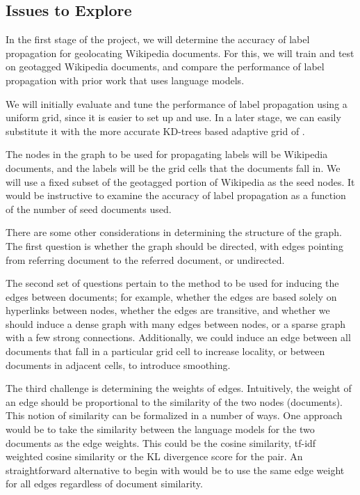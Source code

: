 \documentclass[11pt]{article}
\begin{document}
\subsection{Issues to Explore}
In the first stage of the project, we will determine the accuracy of label propagation for geolocating Wikipedia documents. For this, we will train and test on geotagged Wikipedia documents, and compare the performance of label propagation with prior work that uses language models.

We will initially evaluate and tune the performance of label propagation using a uniform grid, since it is easier to set up and use. In a later stage, we can easily substitute it with the more accurate KD-trees based adaptive grid of \cite{rolleretal:12}.

The nodes in the graph to be used for propagating labels will be Wikipedia documents, and the labels will be the grid cells that the documents fall in. We will use a fixed subset of the geotagged portion of Wikipedia as the seed nodes. It would be instructive to examine the accuracy of label propagation as a function of the number of seed documents used. 

There are some other considerations in determining the structure of the graph. The first question is whether the graph should be directed, with edges pointing from referring document to the referred document, or undirected. 

The second set of questions pertain to the method to be used for inducing the edges between documents; for example, whether the edges are based solely on hyperlinks between nodes, whether the edges are transitive, and whether we should induce a dense graph with many edges between nodes, or a sparse graph with a few strong connections. Additionally, we could induce an edge between all documents that fall in a particular grid cell to increase locality, or between documents in adjacent cells, to introduce smoothing.

The third challenge is determining the weights of edges. Intuitively, the weight of an edge should be proportional to the similarity of the two nodes (documents). This notion of similarity can be formalized in a number of ways. One approach would be to take the similarity between the language models for the two documents as the edge weights. This could be the cosine similarity, tf-idf weighted cosine similarity or the KL divergence score for the pair. An straightforward alternative to begin with would be to use the same edge weight for all edges regardless of document similarity.
 
\end{document}
